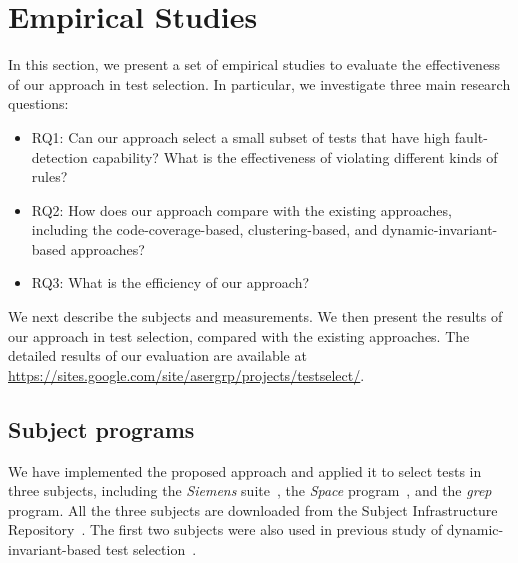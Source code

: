 \documentclass{sig-alternate}
\begin{document}
\section{Empirical Studies} \label{sec:studies}

In this section, we present a set of empirical studies to evaluate
the effectiveness of our approach in test selection. In particular,
we investigate three main research questions:
\begin{itemize}
\item
RQ1: Can our approach select a small subset of tests that have high
fault-detection capability? What is the effectiveness of violating
different kinds of rules?
\item
RQ2: How does our approach compare with the existing approaches,
including the code-coverage-based, clustering-based, and
dynamic-invariant-based approaches?


\item
RQ3: What is the efficiency of our approach?


\end{itemize}


We next describe the subjects and measurements. We then present the
results of our approach in test selection, compared with the
existing approaches. The detailed results of our evaluation are
available at
\url{https://sites.google.com/site/asergrp/projects/testselect/}.



\subsection{Subject programs}

We have implemented the proposed approach and applied it to select
tests in three subjects, including the \emph{Siemens}
suite~\cite{Hutchins94}, the \emph{Space}
program~\cite{Rothermel01}, and the \emph{grep} program. All the
three subjects are downloaded from the Subject Infrastructure
Repository~\cite{SIR}. The first two subjects were also used in
previous study of dynamic-invariant-based test
selection~\cite{Harder03}.
\end{document}

